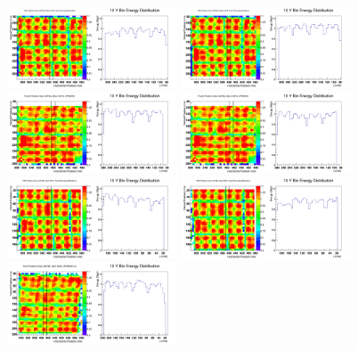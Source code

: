 \documentclass[hidelinks,11pt]{article}
\numberwithin{figure}{section}
\numberwithin{table}{section}
\begin{document}
\begin{figure}[hbtp]
\begin{center}
\includegraphics[width=0.45\textwidth]{Plots/2018/3rd/CombX6.png}
\includegraphics[width=0.45\textwidth]{Plots/2018/3rd/CombX7.png}
\includegraphics[width=0.45\textwidth]{Plots/2018/4th/CombX6.png}
\includegraphics[width=0.45\textwidth]{Plots/2018/4th/CombX7.png}
\includegraphics[width=0.45\textwidth]{Plots/2018/5th/CombX6.png}
\includegraphics[width=0.45\textwidth]{Plots/2018/5th/CombX7.png}
\includegraphics[width=0.45\textwidth]{Plots/2018/6th/CombX6.png}

\end{center}
\end{figure}
\end{document}
